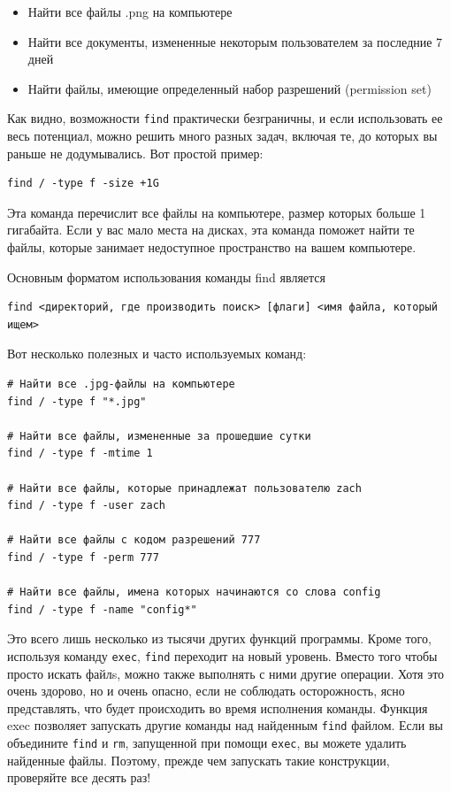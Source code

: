 \documentclass[12pt]{article}
\providecommand{\tightlist}{%
  \setlength{\itemsep}{0pt}\setlength{\parskip}{0pt}}
\begin{document}
\begin{itemize}
\tightlist
\item
  Найти все файлы .png на компьютере
\item
  Найти все документы, измененные некоторым пользователем за последние 7
  дней
\item
  Найти файлы, имеющие определенный набор разрешений (permission set)
\end{itemize}

Как видно, возможности \texttt{find} практически безграничны, и если
использовать ее весь потенциал, можно решить много разных задач, включая
те, до которых вы раньше не додумывались. Вот простой пример:

\begin{verbatim}
find / -type f -size +1G
\end{verbatim}

Эта команда перечислит все файлы на компьютере, размер которых больше 1
гигабайта. Если у вас мало места на дисках, эта команда поможет найти те
файлы, которые занимает недоступное пространство на вашем компьютере.

Основным форматом использования команды find является

\begin{verbatim}
find <директорий, где производить поиск> [флаги] <имя файла, который ищем>
\end{verbatim}

Вот несколько полезных и часто используемых команд:

\begin{verbatim}
# Найти все .jpg-файлы на компьютере
find / -type f "*.jpg"

# Найти все файлы, измененные за прошедшие сутки
find / -type f -mtime 1

# Найти все файлы, которые принадлежат пользователю zach
find / -type f -user zach

# Найти все файлы с кодом разрешений 777
find / -type f -perm 777

# Найти все файлы, имена которых начинаются со слова config
find / -type f -name "config*"
\end{verbatim}

Это всего лишь несколько из тысячи других функций программы. Кроме того,
используя команду \texttt{exec}, \texttt{find} переходит на новый
уровень. Вместо того чтобы просто искать файлs, можно также выполнять с
ними другие операции. Хотя это очень здорово, но и очень опасно, если не
соблюдать осторожность, ясно представлять, что будет происходить во
время исполнения команды. Функция exec позволяет запускать другие
команды над найденным \texttt{find} файлом. Если вы объедините
\texttt{find} и \texttt{rm}, запущенной при помощи \texttt{exec}, вы
можете удалить найденные файлы. Поэтому, прежде чем запускать такие
конструкции, проверяйте все десять раз!
\end{document}
